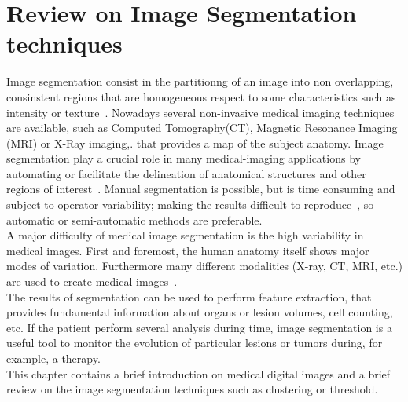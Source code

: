 \documentclass{standalone}
\begin{document}
	\chapter{Review on Image Segmentation techniques}
	Image segmentation consist in the partitionng of an image into non overlapping, consinstent regions that are homogeneous respect to some characteristics such as intensity or texture~\cite{ART:Pham}.
	Nowadays several non-invasive medical imaging techniques are available, such as Computed Tomography(CT), Magnetic Resonance Imaging (MRI) or X-Ray imaging,. that provides a map of the subject anatomy. Image segmentation play a crucial role in many medical-imaging applications by automating or facilitate the delineation of anatomical structures and other regions of interest~\cite{ART:Pham}.  Manual segmentation is  possible, but is time consuming and subject to operator variability; making the results difficult to reproduce~\cite{INP:Withey}, so automatic or semi-automatic methods are preferable. \\
	A major difficulty of medical image segmentation is the high variability in medical images. First and foremost, the human anatomy itself shows major modes of variation. Furthermore many different modalities (X-ray, CT, MRI, etc.) are used to create medical images~\cite{ART:Pooja}.\\
	The results of segmentation can be used to perform feature extraction, that provides fundamental information about organs or lesion volumes, cell counting, etc. If the patient perform several analysis during time, image segmentation is a useful tool to monitor the evolution of particular lesions or tumors during, for example, a therapy.\\
	
	This chapter contains a brief introduction on medical digital images and a brief review on the image segmentation techniques such as clustering or threshold. 
	
\end{document}
